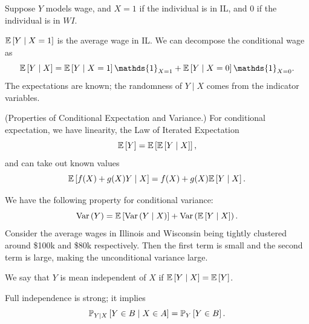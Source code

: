 \begin{example}	Suppose $Y$ models wage, and $X = 1$ if the individual is in IL, and $0$ if the individual is in $WI$.

	$\E\left[Y \mid X=1\right] $ is the average wage in IL. We can decompose the conditional wage as \[
		\E\left[Y \mid X\right] = \E\left[Y \mid X = 1\right] \mathds{1}_{X = 1} + \E\left[Y \mid X = 0\right] \mathds{1}_{X= 0}
		.\] The expectations are known; the randomness of $Y \mid X$ comes from the indicator variables.
\end{example}

\begin{remark}	(Properties of Conditional Expectation and Variance.) For conditional expectation, we have linearity, the Law of Iterated Expectation \[
		\E\left[Y\right]  = \E\left[\E\left[Y \mid X\right] \right]
		,\] and can take out known values \[
		\E\left[f(X) + g(X) Y \mid X\right] = f(X) + g(X) \E\left[Y \mid X\right]
		.\]

	We have the following property for conditional variance: \[
		\operatorname{Var}\left(Y\right) = \E\left[\operatorname{Var}\left(Y \mid X\right)\right] + \operatorname{Var}\left(\E\left[Y \mid X\right] \right)
		.\] Consider the average wages in Illinois and Wisconsin being tightly clustered around \$100k and \$80k respectively. Then the first term is small and the second term is large, making the unconditional variance large.
\end{remark}

\begin{definition}
	We say that $Y$ is mean independent of $X$ if $\E\left[Y \mid X\right] = \E\left[Y\right] $.

	Full independence is strong; it implies \[
		\P_{Y \mid X}\left[Y \in B \mid X \in A\right] = \P_Y\left[Y \in B\right]
		.\]
\end{definition}

